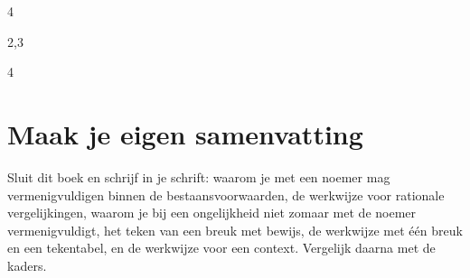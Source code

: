 
\begin{alleenvoor}{4}
\end{alleenvoor}
\begin{alleenvoor}{2,3}
\end{alleenvoor}

\begin{oefeningen}


\begin{alleenvoor}{4}
\end{alleenvoor}
\end{oefeningen}


\begin{oefeningen}





\end{oefeningen}


\ifzelfstudie
\section*{Maak je eigen samenvatting}
Sluit dit boek en schrijf in je schrift: waarom je met een noemer mag vermenigvuldigen binnen de bestaansvoorwaarden, de werkwijze voor rationale vergelijkingen, waarom je bij een ongelijkheid niet zomaar met de noemer vermenigvuldigt, het teken van een breuk met bewijs, de werkwijze met één breuk en een tekentabel, en de werkwijze voor een context. Vergelijk daarna met de kaders.
\fi
